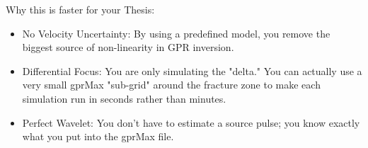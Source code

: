 Why this is faster for your Thesis:
\begin{itemize}
    \item No Velocity Uncertainty: By using a predefined model, you remove the biggest source of non-linearity in GPR inversion.
    \item Differential Focus: You are only simulating the "delta." You can actually use a very small gprMax "sub-grid" around the fracture zone to make each simulation run in seconds rather than minutes.
    \item Perfect Wavelet: You don't have to estimate a source pulse; you know exactly what you put into the gprMax file.
\end{itemize}
